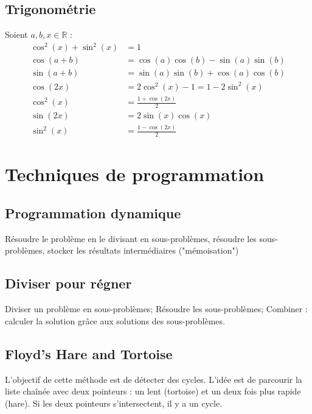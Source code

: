 \documentclass[8pt]{article}
\begin{document}
            \subsection{Trigonométrie}
                    Soient $a,b,x \in \mathbb{R}$ : \\
                    \begin{align}
                        \cos^2(x) + \sin^2(x) &= 1\\
                        \cos(a+b)&=\cos(a)\cos(b)-\sin(a)\sin(b)\\
                        \sin(a+b)&=\sin(a)\sin(b)+\cos(a)\cos(b)\\
                        \cos(2x) &= 2 \cos^2(x) - 1 = 1-2\sin^2(x)\\
                        \cos^2(x) &= \frac{1+\cos(2x)}{2}\\
                        \sin(2x) &= 2\sin(x)\cos(x)\\
                        \sin^2(x)&= \frac{1-\cos(2x)}{2}
                    \end{align}
    \section{Techniques de programmation}
        \subsection{Programmation dynamique}
        Résoudre le problème en le divisant en sous-problèmes, résoudre les sous-problèmes, stocker les résultats
        intermédiaires ("mémoisation")
        \subsection{Diviser pour régner}
        Diviser un problème en sous-problèmes; Résoudre les sous-problèmes; Combiner : calculer la solution grâce aux
        solutions des sous-problèmes.
        \subsection{Floyd's Hare and Tortoise}
        L'objectif de cette méthode est de détecter des cycles. L'idée est de parcourir la liste chaînée
        avec deux pointeurs : un lent (tortoise) et un deux fois plus rapide (hare). Si les deux pointeurs
        s'intersectent, il y a un cycle.
\end{document}
